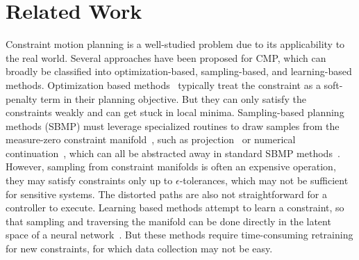 \documentclass[letterpaper, 10 pt, conference]{ieeeconf}
\begin{document}
\section{Related Work}
Constraint motion planning is a well-studied problem due to its applicability to the real world. Several approaches have been proposed for CMP, which can broadly be classified into optimization-based, sampling-based, and learning-based methods. Optimization based methods~\cite{dragan2011manipulation, schulman2014motion,sundaralingam2023curobo1} typically treat the constraint as a soft-penalty term in their planning objective. But they can only satisfy the constraints weakly and can get stuck in local minima.
Sampling-based planning methods (SBMP) must leverage specialized routines to draw samples from the measure-zero constraint manifold~\cite{kingston2018sampling}, such as projection~\cite{berenson2009manipulation} or numerical continuation~\cite{jaillet2013atlasrrt, kim2016tangent}, which can all be abstracted away in standard SBMP methods~\cite{kingston2019exploring}.
However, sampling from constraint manifolds is often an expensive operation, they may satisfy constraints only up to $\epsilon$-tolerances, which may not be sufficient for sensitive systems. The distorted paths are also not straightforward for a controller to execute. 
Learning based methods attempt to learn a constraint, so that sampling and traversing the manifold can be done directly in the latent space of a neural network~\cite{qureshi2020neural, qureshi2021constrained, ni2024physics}.
But these methods require time-consuming retraining for new constraints, for which data collection may not be easy.
\end{document}
